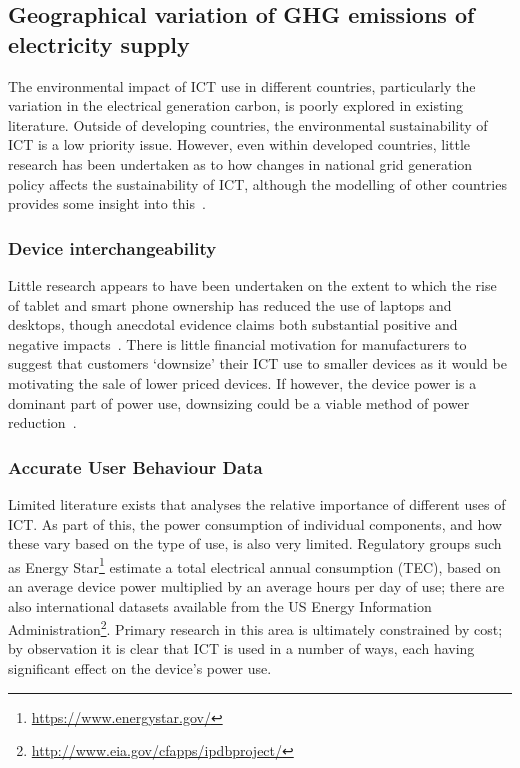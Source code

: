\documentclass[conference]{IEEEtran}
\begin{document}
\subsection{Geographical variation of GHG emissions of electricity
  supply}

The environmental impact of ICT use in different countries,
particularly the variation in the electrical generation carbon, is
poorly explored in existing literature. Outside of developing
countries, the environmental sustainability of ICT is a low priority
issue. However, even within developed countries, little research has
been undertaken as to how changes in national grid generation policy
affects the sustainability of ICT, although the modelling of other
countries provides some insight into this~\cite{malmodin-et-al:2014}.

\subsubsection{Device interchangeability}

Little research appears to have been undertaken on the extent to which
the rise of tablet and smart phone ownership has reduced the use of
laptops and desktops, though anecdotal evidence claims both
substantial positive and negative
impacts~\cite{andrae+andersen:2010}. There is little financial
motivation for manufacturers to suggest that customers `downsize'
their ICT use to smaller devices as it would be motivating the sale of
lower priced devices. If however, the device power is a dominant part
of power use, downsizing could be a viable method of power
reduction~\cite{frey-et-al:2008}.

\subsubsection{Accurate User Behaviour Data}

Limited literature exists that analyses the relative importance of
different uses of ICT. As part of this, the power consumption of
individual components, and how these vary based on the type of use, is
also very limited. Regulatory groups such as Energy
Star\footnote{\url{https://www.energystar.gov/}} estimate a total
electrical annual consumption (TEC), based on an average device power
multiplied by an average hours per day of use; there are also
international datasets available from the US Energy Information
Administration\footnote{\url{http://www.eia.gov/cfapps/ipdbproject/}}.
Primary research in this area is ultimately constrained by cost; by
observation it is clear that ICT is used in a number of ways, each
having significant effect on the device's power use.
\end{document}
